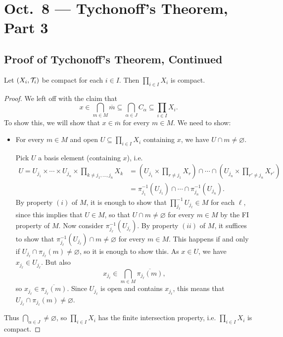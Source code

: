 \chapter{Oct.~8 --- Tychonoff's Theorem, Part 3}

\section{Proof of Tychonoff's Theorem, Continued}
\begin{theorem}[Tychonoff]
  Let $(X_i, \mathcal{T}_i)$ be compact for each $i \in I$.
  Then $\prod_{i \in I} X_i$ is compact.
\end{theorem}

\begin{proof}
  We left off with the claim that
  \[
    x \in \bigcap_{m \in M} \overline{m}
    \subseteq \bigcap_{\alpha \in J} C_\alpha
    \subseteq \prod_{i \in I} X_i.
  \]
  To show this,
  we will show that $x \in \overline{m}$ for every
  $m \in M$. We need to show:
  \begin{itemize}
    \item For every $m \in M$ and open $U \subseteq \prod_{i \in I} X_i$ containing $x$,
      we have $U \cap m \ne \varnothing$.

      Pick $U$ a basis element (containing $x$), i.e.
      \begin{align*}
        U = U_{j_1} \times \cdots \times U_{j_n} \times
        \prod_{k \ne j_1, \ldots, j_n} X_k
        &= \left(U_{j_1} \times \prod_{r \ne j_1} X_r\right)
        \cap \cdots \cap \left(U_{j_n} \times \prod_{r' \ne j_n} X_{r'}\right) \\
        &= \pi_{j_1}^{-1}(U_{j_1}) \cap \cdots \cap \pi_{j_n}^{-1}(U_{j_n}).
      \end{align*}
      By property $(i)$ of $M$, it is enough to show
      that $\prod_{j_\ell}^{-1} U_{j_\ell} \in M$ for
      each $\ell$,
      since this implies that $U \in M$, so that
      $U \cap m \ne \varnothing$ for every $m \in M$
      by the FI property of
      $M$. Now consider $\pi_{j_\ell}^{-1}(U_{j_\ell})$.
      By property $(ii)$ of $M$, it suffices to show
      that
      $\pi_{j_\ell}^{-1}(U_{j_\ell}) \cap m \ne \varnothing$
      for every $m \in M$. This happens if
      and only if $U_{j_\ell} \cap \pi_{j_\ell}(m) \ne \varnothing$, so it is enough to show this.
      As $x \in U$, we have $x_{j_\ell} \in U_{j_\ell}$.
      But also
      \[
        x_{j_\ell} \in \bigcap_{m \in M} \overline{\pi_{j_\ell}(m)},
      \]
      so $x_{j_\ell} \in \overline{\pi_{j_\ell}(m)}$.
      Since $U_{j_\ell}$ is open and contains $x_{j_\ell}$,
      this means that $U_{j_\ell} \cap \pi_{j_\ell}(m) \ne \varnothing$.
  \end{itemize}
  Thus $\bigcap_{\alpha \in J} \ne \varnothing$,
  so $\prod_{i \in I} X_i$ has the finite intersection
  property, i.e. $\prod_{i \in I} X_i$ is compact.
\end{proof}

